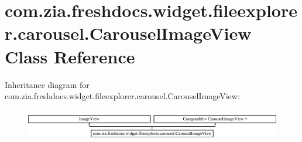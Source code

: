 \hypertarget{classcom_1_1zia_1_1freshdocs_1_1widget_1_1fileexplorer_1_1carousel_1_1_carousel_image_view}{\section{com.\-zia.\-freshdocs.\-widget.\-fileexplorer.\-carousel.\-Carousel\-Image\-View Class Reference}
\label{classcom_1_1zia_1_1freshdocs_1_1widget_1_1fileexplorer_1_1carousel_1_1_carousel_image_view}
}
Inheritance diagram for com.\-zia.\-freshdocs.\-widget.\-fileexplorer.\-carousel.\-Carousel\-Image\-View\-:\begin{figure}[H]
\begin{center}
\leavevmode
\includegraphics[height=1.400000cm]{classcom_1_1zia_1_1freshdocs_1_1widget_1_1fileexplorer_1_1carousel_1_1_carousel_image_view}
\end{center}
\end{figure}
